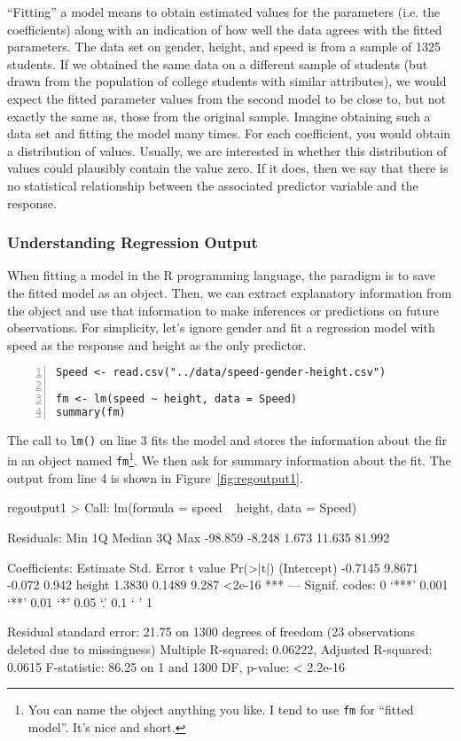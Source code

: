 ``Fitting'' a model means to obtain estimated values for the
parameters (i.e. the coefficients) along with an indication of how
well the data agrees with the fitted parameters. The data set on
gender, height, and speed is from a sample of \num{1325} students.  If
we obtained the same data on a different sample of students (but drawn
from the population of college students with similar attributes), we
would expect the fitted parameter values from the second model to be
close to, but not exactly the same as, those from the original
sample. Imagine obtaining such a data set and fitting the model many
times.  For each coefficient, you would obtain a distribution of
values. Usually, we are interested in whether this distribution of
values could plausibly contain the value zero. If it does, then we say
that there is no statistical relationship between the associated
predictor variable and the response.

\subsubsection*{Understanding Regression Output}

When fitting a model in the R programming language, the paradigm is to
save the fitted model as an object. Then, we can extract explanatory
information from the object and use that information to make
inferences or predictions on future observations. For simplicity,
let's ignore gender and fit a regression model with speed as the
response and height as the only predictor.

\begin{Verbatim}[numbers=left,xleftmargin=5mm]
Speed <- read.csv("../data/speed-gender-height.csv")

fm <- lm(speed ~ height, data = Speed)
summary(fm)
\end{Verbatim}

The call to \texttt{lm()} on line 3 fits the model and stores the
information about the fir in an object named \texttt{fm}\footnote{You
  can name the object anything you like. I tend to use \texttt{fm} for
  ``fitted model''. It's nice and short.}.  We then ask for summary
information about the fit. The output from line 4 is shown in
Figure~\ref{fig:regoutput1}.

\begin{SaveVerbatim}{regoutput1}
> 
Call:
lm(formula = speed ~ height, data = Speed)

Residuals:
    Min      1Q  Median      3Q     Max 
-98.859  -8.248   1.673  11.635  81.992 

Coefficients:
            Estimate Std. Error t value Pr(>|t|)    
(Intercept)  -0.7145     9.8671  -0.072    0.942    
height        1.3830     0.1489   9.287   <2e-16 ***
---
Signif. codes:  0 ‘***’ 0.001 ‘**’ 0.01 ‘*’ 0.05 ‘.’ 0.1 ‘ ’ 1

Residual standard error: 21.75 on 1300 degrees of freedom
  (23 observations deleted due to missingness)
Multiple R-squared:  0.06222,	Adjusted R-squared:  0.0615 
F-statistic: 86.25 on 1 and 1300 DF,  p-value: < 2.2e-16
\end{SaveVerbatim}

